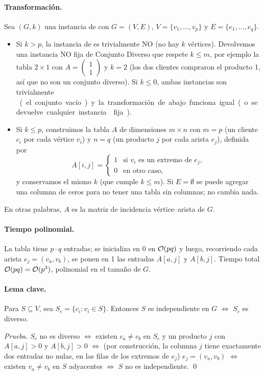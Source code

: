 \paragraph{Transformación.} Sea $(G,k)$ una instancia de \IS{} con $G=(V,E)$, $V=\{v_1,\dots,v_p\}$ y
$E=\{e_1,\dots,e_q\}$.
\begin{itemize}
  \item Si $k>p$, la instancia de \IS{} es trivialmente NO (no hay $k$ vértices). Devolvemos una instancia
  NO fija de Conjunto Diverso que respete $k\le m$, por ejemplo la tabla $2\times 1$ con
  $A=\begin{pmatrix}1\\1\end{pmatrix}$ y $k=2$ (los dos clientes compraron el producto 1, así que no son un
  conjunto diverso). Si $k\le 0$, ambas instancias son trivialmente \SI{} (el conjunto vacío) y la
  transformación de abajo funciona igual (o se devuelve cualquier instancia \SI{} fija).
  \item Si $k\le p$, construimos la tabla $A$ de dimensiones $m\times n$ con $m=p$ (un cliente $c_i$ por
  cada vértice $v_i$) y $n=q$ (un producto $j$ por cada arista $e_j$), definida por
  \[
    A[i,j]=\begin{cases} 1 & \text{si } v_i \text{ es un extremo de } e_j,\\ 0 & \text{en otro caso,}\end{cases}
  \]
  y conservamos el mismo $k$ (que cumple $k\le m$). Si $E=\emptyset$ se puede agregar una columna de ceros para
  no tener una tabla sin columnas; no cambia nada.
\end{itemize}
En otras palabras, $A$ es la matriz de incidencia vértice--arista de $G$.

\paragraph{Tiempo polinomial.} La tabla tiene $p\cdot q$ entradas; se inicializa en 0 en $\mathcal{O}(pq)$ y luego,
recorriendo cada arista $e_j=(v_a,v_b)$, se ponen en 1 las entradas $A[a,j]$ y $A[b,j]$. Tiempo total
$\mathcal{O}(pq)=\mathcal{O}(p^3)$, polinomial en el tamaño de $G$.

\paragraph{Lema clave.} Para $S\subseteq V$, sea $S_c=\{c_i : v_i\in S\}$. Entonces $S$ es independiente en
$G$ $\iff$ $S_c$ es diverso.

\emph{Prueba.} $S_c$ no es diverso $\iff$ existen $c_a\ne c_b$ en $S_c$ y un producto $j$ con
$A[a,j]>0$ y $A[b,j]>0$ $\iff$ (por construcción, la columna $j$ tiene exactamente dos entradas no nulas, en
las filas de los extremos de $e_j$) $e_j=(v_a,v_b)$ $\iff$ existen $v_a\ne v_b$ en $S$ adyacentes $\iff$ $S$
no es independiente. \qed

